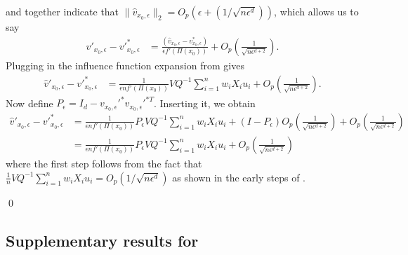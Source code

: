 \documentclass[11pt]{article}
\begin{document}
 and  together indicate that $\|\hat{v}_{x_0, \epsilon}\|_2 = O_p(\epsilon + (1/\sqrt{n\epsilon^d}))$, which allows us to say
\begin{align*}
    \hat{v}'_{x_0, \epsilon} - v'^*_{x_0, \epsilon} &= \frac{(\hat{v}_{x_0, \epsilon} - v^*_{x_0, \epsilon})}{\epsilon f'(\Pi(x_0))} + O_p\left(\frac{1}{\sqrt{n\epsilon^{d+2}}}\right).
\end{align*}
Plugging in the influence function expansion from  gives
\begin{align*}
    \hat{v}'_{x_0, \epsilon} - v'^*_{x_0, \epsilon} &= \frac{1}{\epsilon n f'(\Pi(x_0))}VQ^{-1}\sum_{i = 1}^nw_iX_iu_i + O_p\left(\frac{1}{\sqrt{n\epsilon^{d+2}}}\right).
\end{align*}
Now define $P_{\epsilon} = I_d - v_{x_0, \epsilon}'^{*}v_{x_0, \epsilon}'^{*T}$. Inserting it, we obtain
\begin{align*}
    \hat{v}'_{x_0, \epsilon} - v'^*_{x_0, \epsilon} &= \frac{1}{\epsilon n f'(\Pi(x_0))}P_{\epsilon}VQ^{-1}\sum_{i = 1}^nw_iX_iu_i + (I- P_{\epsilon})O_p\left(\frac{1}{\sqrt{n\epsilon^{d+2}}}\right) +  O_p\left(\frac{1}{\sqrt{n\epsilon^{d+2}}}\right) \\
    &= \frac{1}{\epsilon n f'(\Pi(x_0))}P_{\epsilon}VQ^{-1}\sum_{i = 1}^nw_iX_iu_i + O_p\left(\frac{1}{\sqrt{n\epsilon^{d+2}}}\right)
\end{align*}
where the first step follows from the fact that $\frac{1}{n}VQ^{-1}\sum_{i = 1}^nw_iX_iu_i = O_p(1/\sqrt{n\epsilon^d})$ as shown in the early steps of . 

\qed{}



\subsection{Supplementary results for }
\end{document}
